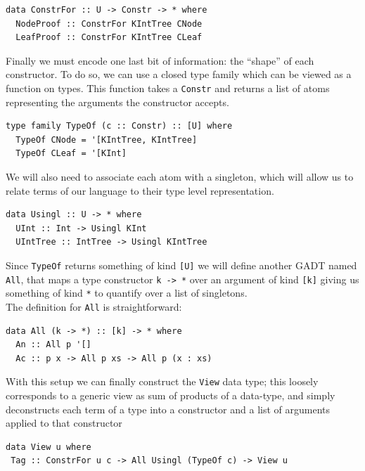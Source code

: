 \documentclass[11pt, titlepage]{article}
\newcommand{\toHaskell}[1]{\texttt{#1}\xspace}
\begin{document}
\begin{verbatim}
data ConstrFor :: U -> Constr -> * where
  NodeProof :: ConstrFor KIntTree CNode
  LeafProof :: ConstrFor KIntTree CLeaf
\end{verbatim}

Finally we must encode one last bit of information: the ``shape'' of
each constructor. To do so, we can use a closed type family which can be
viewed as a function on types. This function takes a \texttt{Constr} and
returns a list of atoms representing the arguments the constructor
accepts.

\begin{verbatim}
type family TypeOf (c :: Constr) :: [U] where
  TypeOf CNode = '[KIntTree, KIntTree]
  TypeOf CLeaf = '[KInt]
\end{verbatim}

We will also need to associate each atom with a singleton, which will
allow us to relate terms of our language to their type level representation. 

\begin{verbatim}
data Usingl :: U -> * where
  UInt :: Int -> Usingl KInt
  UIntTree :: IntTree -> Usingl KIntTree
\end{verbatim}

Since \toHaskell{TypeOf} returns something of kind \toHaskell{[U]} we will define another GADT named \toHaskell{All}, that maps a type constructor \toHaskell{k -> *} over an argument of kind \texttt{[k]} giving us something of kind \texttt{*} to quantify over a list of singletons.
\\
The definition for \texttt{All} is straightforward:

\begin{verbatim}
data All (k -> *) :: [k] -> * where
  An :: All p '[]
  Ac :: p x -> All p xs -> All p (x : xs)
\end{verbatim}


With this setup we can finally construct the \texttt{View} data type; this loosely corresponds to a generic view as sum of products of a data-type, and simply deconstructs each term of a type into a constructor and a list of arguments applied to that constructor

\begin{verbatim}
data View u where
 Tag :: ConstrFor u c -> All Usingl (TypeOf c) -> View u
\end{verbatim}
\end{document}
